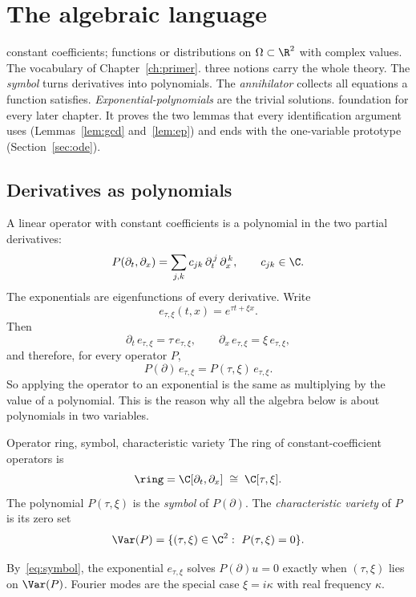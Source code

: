 \chapter{The algebraic language}\label{ch:algebra}
\chapterbrief
{constant coefficients; functions or distributions on $\Omega\subset\R^2$ with complex values. The vocabulary of Chapter~\ref{ch:primer}.}
{three notions carry the whole theory. The \emph{symbol} turns derivatives into polynomials. The \emph{annihilator} collects all equations a function satisfies. \emph{Exponential-polynomials} are the trivial solutions.}
{foundation for every later chapter. It proves the two lemmas that every identification argument uses (Lemmas~\ref{lem:gcd} and~\ref{lem:ep}) and ends with the one-variable prototype (Section~\ref{sec:ode}).}

\section{Derivatives as polynomials}

A linear operator with constant coefficients is a polynomial in the two partial derivatives:
\[
P(\partial_t,\partial_x)=\sum_{j,k}c_{jk}\,\partial_t^{\,j}\,\partial_x^{\,k},\qquad c_{jk}\in\C .
\]
The exponentials are eigenfunctions of every derivative. Write
\[
e_{\tau,\xi}(t,x)=e^{\tau t+\xi x}.
\]
Then
\[
\partial_t\,e_{\tau,\xi}=\tau\,e_{\tau,\xi},\qquad
\partial_x\,e_{\tau,\xi}=\xi\,e_{\tau,\xi},
\]
and therefore, for every operator $P$,
\begin{equation}\label{eq:symbol}
P(\partial)\,e_{\tau,\xi}=P(\tau,\xi)\,e_{\tau,\xi}.
\end{equation}
So applying the operator to an exponential is the same as multiplying by the value of a polynomial. This is the reason why all the algebra below is about polynomials in two variables.

\begin{definition}{Operator ring, symbol, characteristic variety}\label{def:ring}
The ring of constant-coefficient operators is
\[
\ring=\C[\partial_t,\partial_x]\;\cong\;\C[\tau,\xi].
\]
The polynomial $P(\tau,\xi)$ is the \emph{symbol} of $P(\partial)$. The \emph{characteristic variety} of $P$ is its zero set
\[
\Var(P)=\{(\tau,\xi)\in\C^2:\ P(\tau,\xi)=0\}.
\]
\end{definition}

By~\eqref{eq:symbol}, the exponential $e_{\tau,\xi}$ solves $P(\partial)u=0$ exactly when $(\tau,\xi)$ lies on $\Var(P)$. Fourier modes are the special case $\xi=i\kappa$ with real frequency $\kappa$.

